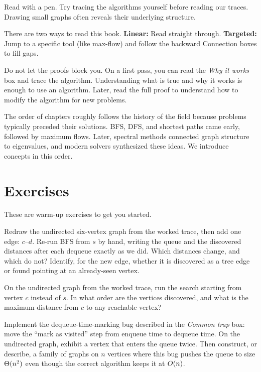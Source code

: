 Read with a pen. Try tracing the algorithms yourself before reading our traces. Drawing small graphs often reveals their underlying structure.

\begin{marginnotebox}
There are two ways to read this book. \textbf{Linear:} Read straight through. \textbf{Targeted:} Jump to a specific tool (like max-flow) and follow the backward Connection boxes to fill gaps.
\end{marginnotebox}

Do not let the proofs block you. On a first pass, you can read the \emph{Why it works} box and trace the algorithm. Understanding what is true and why it works is enough to use an algorithm. Later, read the full proof to understand how to modify the algorithm for new problems.

\begin{historybox}
The order of chapters roughly follows the history of the field because problems typically preceded their solutions. BFS, DFS, and shortest paths came early, followed by maximum flows. Later, spectral methods connected graph structure to eigenvalues, and modern solvers synthesized these ideas. We introduce concepts in this order.
\end{historybox}

\section*{Exercises}

These are warm-up exercises to get you started.

\begin{exercise}
Redraw the undirected six-vertex graph from the worked trace, then add one edge:
$c$--$d$. Re-run BFS from $s$ by hand, writing the queue and the discovered
distances after each dequeue exactly as we did. Which distances change, and which
do not? Identify, for the new edge, whether it is discovered as a tree edge or
found pointing at an already-seen vertex.
\end{exercise}

\begin{exercise}
On the undirected graph from the worked trace, run the search starting from vertex
$c$ instead of $s$. In what order are the vertices discovered, and what is the
maximum distance from $c$ to any reachable vertex?
\end{exercise}

\begin{exercise}
Implement the dequeue-time-marking bug described in the \emph{Common trap} box:
move the ``mark as visited'' step from enqueue time to dequeue time. On the
undirected graph, exhibit a vertex that enters the queue twice. Then construct, or
describe, a family of graphs on $n$ vertices where this bug pushes the queue to
size $\Theta(n^2)$ even though the correct algorithm keeps it at $O(n)$.
\end{exercise}

